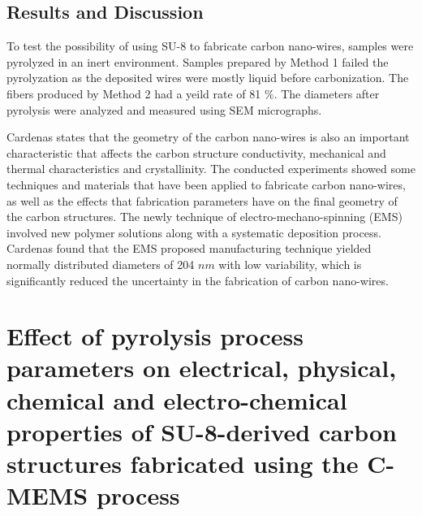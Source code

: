 \subsection{Results and Discussion}
To test the possibility of using SU-8 to fabricate carbon nano-wires, samples were pyrolyzed in an inert environment. Samples prepared by Method 1 failed the pyrolyzation as the deposited wires were mostly liquid before carbonization. The fibers produced by Method 2 had a yeild rate of 81 $\%$. The diameters after pyrolysis were analyzed and measured using SEM micrographs.

Cardenas \cite{Cardenas2017} states that the geometry of the carbon nano-wires is also an important characteristic that affects the carbon structure conductivity, mechanical and thermal characteristics and crystallinity. The conducted experiments showed some techniques and materials that have been applied to fabricate carbon nano-wires, as well as the effects that fabrication parameters have on the final geometry of the carbon structures. The newly technique of electro-mechano-spinning (EMS) involved new polymer solutions along with a systematic deposition process. Cardenas found that the EMS proposed manufacturing technique yielded normally distributed diameters of 204 $nm$ with low variability, which is significantly reduced the uncertainty in the fabrication of carbon nano-wires.

\section{Effect of pyrolysis process parameters on electrical, physical, chemical and electro-chemical properties of SU-8-derived carbon structures fabricated using the C-MEMS process \cite{Pramanick2018}}




